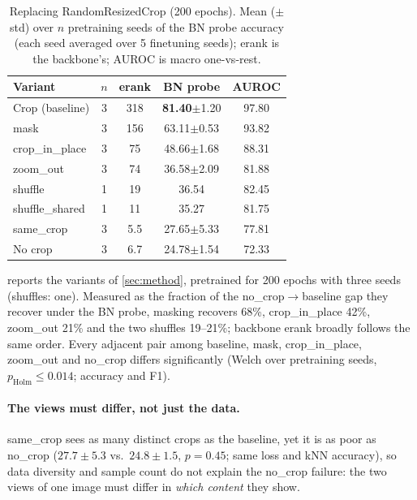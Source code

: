 \documentclass[10pt,twocolumn,letterpaper]{article}
\newcommand{\pmstd}[1]{{\scriptsize$\pm$#1}}
\begin{document}
\begin{table}[t]
\centering
\small
\setlength\tabcolsep{3pt}
\begin{tabular}{lcccc}
\toprule
Variant & $n$ & erank & BN probe & AUROC \\
\midrule
Crop (baseline) & 3 & 318 & \textbf{81.40}\pmstd{1.20} & 97.80 \\
mask & 3 & 156 & 63.11\pmstd{0.53} & 93.82 \\
crop\_in\_place & 3 & 75 & 48.66\pmstd{1.68} & 88.31 \\
zoom\_out & 3 & 74 & 36.58\pmstd{2.09} & 81.88 \\
shuffle & 1 & 19 & 36.54 & 82.45 \\
shuffle\_shared & 1 & 11 & 35.27 & 81.75 \\
same\_crop & 3 & 5.5 & 27.65\pmstd{5.33} & 77.81 \\
No crop & 3 & 6.7 & 24.78\pmstd{1.54} & 72.33 \\
\bottomrule
\end{tabular}
\caption{Replacing RandomResizedCrop (200 epochs). Mean (\pmstd{std}) over $n$ pretraining seeds of the BN probe accuracy (each seed averaged over 5 finetuning seeds); erank is the backbone's; AUROC is macro one-vs-rest.}
\label{tab:crop}
\end{table}

 reports the variants of \cref{sec:method}, pretrained for 200 epochs with three seeds (shuffles: one).
Measured as the fraction of the no\_crop$\to$baseline gap they recover under the BN probe, masking recovers 68\%, crop\_in\_place 42\%, zoom\_out 21\% and the two shuffles 19--21\%; backbone erank broadly follows the same order.
Every adjacent pair among baseline, mask, crop\_in\_place, zoom\_out and no\_crop differs significantly (Welch over pretraining seeds, $p_\text{Holm}\le0.014$; accuracy and F1).

\paragraph{The views must differ, not just the data.}
same\_crop sees as many distinct crops as the baseline, yet it is as poor as no\_crop ($27.7\pm5.3$ vs.\ $24.8\pm1.5$, $p{=}0.45$; same loss and kNN accuracy), so data diversity and sample count do not explain the no\_crop failure: the two views of one image must differ in \emph{which content} they show.
\end{document}
